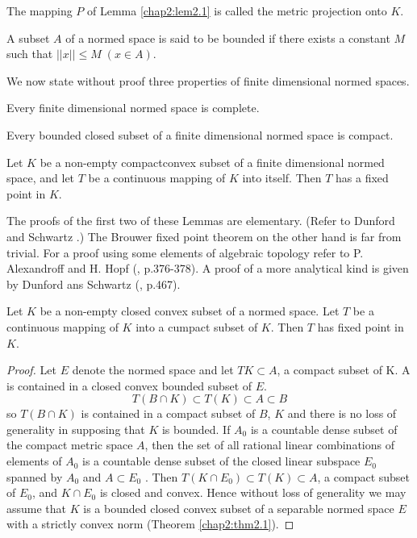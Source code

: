 \begin{Definition}%
  The mapping $P$ of Lemma \ref{chap2:lem2.1} is called the metric
  projection onto $K$. 
\end{Definition}

\begin{Definition}%
  A subset $A$ of a normed space is said to be bounded if there exists
  a constant $M$ such that $||x|| \le M\; (x \in A)$. 
\end{Definition}
 
 We now state without proof three properties of finite dimensional
 normed spaces. 
 
 \begin{lemma}%
 Every finite dimensional normed space is complete.
 \end{lemma} 

 \begin{lemma}\label{chap2:lem2.3}%
 Every bounded closed subset of a finite dimensional norm\-ed space is compact.
 \end{lemma} 

\begin{lemma}%
  Let $K$ be a non-empty compact\pageoriginale convex subset of a
  finite dimensional normed space, and let $T$ be a continuous mapping
  of $K$ into itself. Then $T$ has a fixed point in $K$.  
\end{lemma} 

The proofs of the first two of these Lemmas are elementary. (Refer to
Dunford and Schwartz \cite[p. 244-245]{key14}.) The Brouwer fixed point
theorem on the other hand is far from trivial. For a proof using some
elements of algebraic topology refer to P. Alexandroff and H. Hopf
(\cite{key1}, p.376-378). A proof of a more analytical kind is given by
Dunford ans Schwartz (\cite{key14}, p.467). 

\begin{thmm}[Schauder]\label{chap2:thm2.2}%
  Let $K$ be a non-empty closed convex subset of a normed space. Let
  $T$ be a continuous mapping of $K$ into a cumpact subset of
  $K$. Then $T$ has fixed point in $K$. 
\end{thmm} 

\begin{proof}
  Let $E$ denote the normed space and let $T K \subset A$, a compact
  subset of K. A is contained in a closed convex bounded subset of
  $E$. 
 $$
 T(B \cap K) \subset T (K) \subset A \subset B
 $$
 so $T(B \cap K)$ is contained in a compact subset of $B$, $K$ and there
 is no loss of generality in supposing that $K$ is bounded. If $A_0$
 is a countable dense subset of the compact metric space $A$, then the
 set of all rational linear combinations of elements of $A_0$ is a
 countable dense subset of the closed linear subspace $E_0$ spanned by
 $A_0$ and $A \subset E_0$ . Then $T (K \cap E_0) \subset T (K)
 \subset A$, a compact subset of $E_0$, and $K \cap E_0$ is closed and
 convex. Hence without loss of generality we may assume that $K$ is a
 bounded closed convex subset of a separable normed space $E$ with a
 strictly convex norm (Theorem \ref{chap2:thm2.1}). 
\end{proof}

